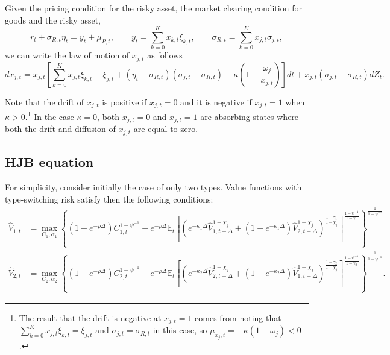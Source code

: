 \documentclass[11pt,english]{article}
\begin{document}
Given the pricing condition for the risky asset, the market clearing condition for goods and the risky asset, 
\begin{equation*}
    r_t + \sigma_{R,t} \eta_t = y_t + \mu_{P,t}, \qquad y_t = \sum_{k=0}^K x_{k,t} \xi_{k,t}, \qquad \sigma_{R,t} = \sum_{k=0}^K x_{j,t} \sigma_{j,t},
 \end{equation*}
we can write the law of motion of $x_{j,t}$ as follows
\begin{equation*}
    d x_{j,t} = x_{j,t}\left[ \sum_{k=0}^K x_{j,t} \xi_{k,t} -  \xi_{j,t} + (\eta_t-\sigma_{R,t}) (\sigma_{j,t}-\sigma_{R,t})   - \kappa \left( 1 - \frac{\omega_j}{x_{j,t}} \right)\right] dt + x_{j,t}(\sigma_{j,t} - \sigma_{R,t})   d Z_t.
\end{equation*}

Note that the drift of $x_{j,t}$ is positive if $x_{j,t} = 0$ and it is negative if $x_{j,t} = 1$ when $\kappa > 0$.\footnote{The result that the drift is negative at $x_{j,t}=1$ comes from noting that $\sum_{k=0}^K x_{j,t} \xi_{k,t} =  \xi_{j,t}$ and $\sigma_{j,t} = \sigma_{R,t}$ in this case, so $\mu_{x_j,t} = -\kappa (1-\omega_j) <0$.} 
In the case $\kappa = 0$, both $x_{j,t} = 0$ and $x_{j,t} = 1$ are absorbing states where both the drift and diffusion of $x_{j,t}$ are equal to zero. 

\subsection{HJB equation}

For simplicity, consider initially the case of only two types. 
Value functions with type-switching risk satisfy then the following conditions:
\begin{align*}
    \hat{V}_{1,t} &= \max_{C_1,\alpha_1}\left\{ (1-e^{-\rho \Delta}) C_{1,t}^{1-\psi^{-1}} + e^{-\rho \Delta} \mathbb{E}_t\left[  \left( e^{-\kappa_{1} \Delta } \hat{V}_{1,t+\Delta}^{1-\chi_j} + (1-e^{-\kappa_1 \Delta} ) \hat{V}_{2,t+\Delta}^{1-\chi_j}\right)^{\frac{1-\gamma_1}{1-\chi_j}} \right]^{\frac{1-\psi^{-1}}{1-\gamma_1}}\right\}^{\frac{1}{1-\psi^{-1}}}\\
    \hat{V}_{2,t} &= \max_{C_2,\alpha_2}\left\{ (1-e^{-\rho \Delta}) C_{2,t}^{1-\psi^{-1}} + e^{-\rho \Delta} \mathbb{E}_t\left[  \left( e^{-\kappa_{2} \Delta } \hat{V}_{2,t+\Delta}^{1-\chi_j} + (1-e^{-\kappa_2 \Delta} ) \hat{V}_{1,t+\Delta}^{1-\chi_j}\right)^{\frac{1-\gamma_2}{1-\chi_j}} \right]^{\frac{1-\psi^{-1}}{1-\gamma_2}}\right\}^{\frac{1}{1-\psi^{-1}}}.
\end{align*}
\end{document}

